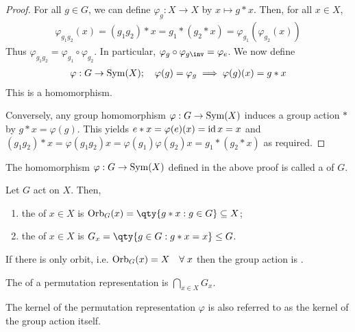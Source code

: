 \begin{proof}
	For all $g \in G$, we can define $\varphi_g : X \to X$ by $x \mapsto g \ast x$.
	Then, for all $x \in X$,
	\begin{align*}
		\varphi_{g_1 g_2} (x) = (g_1 g_2) \ast x = g_1 \ast (g_2 \ast x) = \varphi_{g_1}(\varphi_{g_2}(x))
	\end{align*}
	Thus $\varphi_{g_1 g_2} = \varphi_{g_1} \circ \varphi_{g_2}$.
	In particular, $\varphi_g \circ \varphi_{g\inv} = \varphi_e$.
	We now define
	\begin{align*}
		\varphi : G \to \operatorname{Sym}(X);\quad \varphi(g) = \varphi_g \implies \varphi(g)(x) = g \ast x
	\end{align*}
	This is a homomorphism.

	Conversely, any group homomorphism $\varphi : G \to \operatorname{Sym}(X)$ induces a group action $\ast$ by $g \ast x = \varphi(g)$.
	This yields $e \ast x = \varphi(e)(x) = \operatorname{id} x = x$ and $(g_1 g_2) \ast x = \varphi(g_1 g_2) x = \varphi(g_1) \varphi(g_2) x = g_1 \ast (g_2 \ast x)$ as required.
\end{proof}

\begin{definition}
	The homomorphism $\varphi : G \to \operatorname{Sym}(X)$ defined in the above proof is called a  of $G$.
\end{definition}

\begin{definition}
	Let $G$ act on $X$.
	Then,
	\begin{enumerate}
		\item the  of $x \in X$ is $\Orb_G(x) = \qty{g \ast x : g \in G} \subseteq X$;
		\item the  of $x \in X$ is $G_x = \qty{g \in G : g \ast x = x} \leq G$.
	\end{enumerate}
\end{definition}

\begin{definition}
	If there is only orbit, i.e. $\operatorname{Orb}_G(x) = X \quad \forall \; x$ then the group action is .
\end{definition} 

\begin{definition}[Kernel]
	The  of a permutation representation is $\bigcap_{x \in X} G_x$.
\end{definition} 

\begin{remark}
	The kernel of the permutation representation $\varphi$ is also referred to as the kernel of the group action itself.
\end{remark} 

